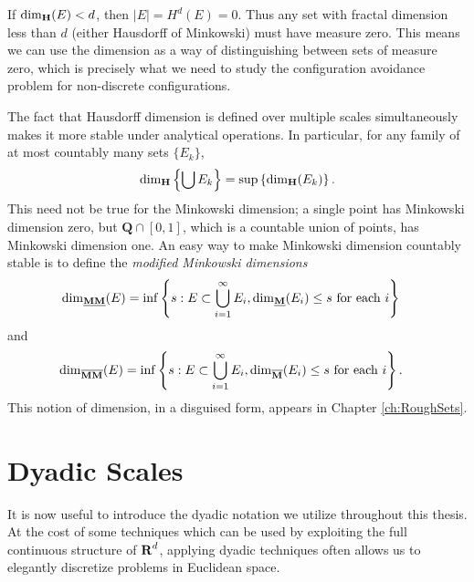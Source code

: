 \begin{remark}
	If $\operatorname{\dim_{\mathbf{H}}}(E) < d$, then $|E| = H^d(E) = 0$. Thus any set with fractal dimension less than $d$ (either Hausdorff of Minkowski) must have measure zero. This means we can use the dimension as a way of distinguishing between sets of measure zero, which is precisely what we need to study the configuration avoidance problem for non-discrete configurations.
\end{remark}

The fact that Hausdorff dimension is defined over multiple scales simultaneously makes it more stable under analytical operations. In particular, for any family of at most countably many sets $\{ E_k \}$,
%
\[ \operatorname{\dim_{\mathbf{H}}} \left\{ \bigcup E_k \right\} = \sup \left\{ \operatorname{\dim_{\mathbf{H}}}(E_k) \right\}. \]
%
This need not be true for the Minkowski dimension; a single point has Minkowski dimension zero, but $\mathbf{Q} \cap [0,1]$, which is a countable union of points, has Minkowski dimension one. An easy way to make Minkowski dimension countably stable is to define the \emph{modified Minkowski dimensions}
%
\begin{align*}
	\operatorname{\dim_{\underline{\mathbf{MM}}}}(E) &= \inf \left\{ s : E \subset \bigcup_{i = 1}^\infty E_i, \operatorname{\dim_{\underline{\mathbf{M}}}}(E_i) \leq s\ \text{for each $i$} \right\}
\end{align*}
%
and
%
\begin{align*}
	\operatorname{\dim_{\overline{\mathbf{MM}}}}(E) &= \inf \left\{ s : E \subset \bigcup_{i = 1}^\infty E_i, \operatorname{\dim_{\overline{\mathbf{M}}}}(E_i) \leq s\ \text{for each $i$} \right\}.
\end{align*}
%
This notion of dimension, in a disguised form, appears in Chapter \ref{ch:RoughSets}.










\section{Dyadic Scales} \label{sec:Dyadics}

It is now useful to introduce the dyadic notation we utilize throughout this thesis. At the cost of some techniques which can be used by exploiting the full continuous structure of $\operatorname{\mathbf{R}}^d$, applying dyadic techniques often allows us to elegantly discretize problems in Euclidean space.

